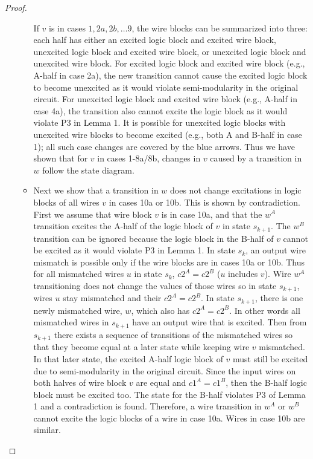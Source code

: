 \documentclass[12pt]{report}
\begin{document}
\begin{proof}
\begin{itemize}
\begin{itemize}
If $v$ is in cases $1,2a,2b,\dots9$, the wire blocks can be summarized into three: each half has either an excited logic block and excited wire block, unexcited logic block and excited wire block, or unexcited logic block and unexcited wire block.  For excited logic block and excited wire block (e.g., A-half in case 2a), the new transition cannot cause the excited logic block to become unexcited as it would violate semi-modularity in the original circuit.  For unexcited logic block and excited wire block (e.g., A-half in case 4a), the transition also cannot excite the logic block as it would violate P3 in Lemma 1.  It is possible for unexcited logic blocks with unexcited wire blocks to become excited (e.g., both A and B-half in case 1); all such case changes are covered by the blue arrows.  Thus we have shown that for $v$ in cases 1-8a/8b, changes in $v$ caused by a transition in $w$ follow the state diagram.  
\item
Next we show that a transition in $w$ does not change excitations in logic blocks of all wires $v$ in cases 10a or 10b.  This is shown by contradiction.  
First we assume that wire block $v$ is in case 10a, and that the $w^A$ transition excites the A-half of the logic block of $v$ in state $s_{k+1}$.  The $w^B$ transition can be ignored because the logic block in the B-half of $v$ cannot be excited as it would violate P3 in Lemma 1.  In state $s_k$, an output wire mismatch is possible only if the wire blocks are in cases 10a or 10b.  Thus for all mismatched wires $u$ in state $s_k$, $c2^A=c2^B$ (${u}$ includes $v$).  Wire $w^A$ transitioning does not change the values of those wires so in state $s_{k+1}$, wires $u$ stay mismatched and their $c2^A=c2^B$.  In state $s_{k+1}$, there is one newly mismatched wire, $w$, which also has $c2^A=c2^B$.  In other words all mismatched wires in $s_{k+1}$ have an output wire that is excited. Then from $s_{k+1}$ there exists a sequence of transitions of the mismatched wires so that they become equal at a later state while keeping wire $v$ mismatched.  In that later state, the excited A-half logic block of $v$ must still be excited due to semi-modularity in the original circuit.  %
Since the input wires on both halves of wire block $v$ are equal and $c1^A=c1^B$, then the B-half logic block must be excited too.  The state for the B-half violates P3 of Lemma 1 and a contradiction is found.  Therefore, a wire transition in $w^A$ or $w^B$ cannot excite the logic blocks of a wire in case 10a.  Wires in case 10b are similar.

\end{itemize}
\end{itemize}
\end{proof}
\end{document}
